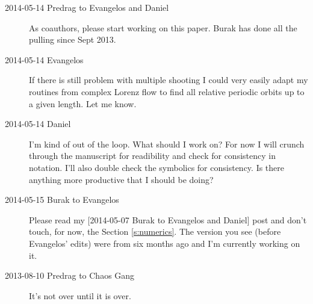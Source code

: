 \begin{description}
\item[2014-05-14 Predrag to Evangelos and Daniel] As coauthors, please start
working on this paper. Burak has done all the pulling since Sept 2013.

\item[2014-05-14 Evangelos] If there is still problem with multiple shooting
I could very easily adapt my routines from complex Lorenz flow to find
all relative periodic orbits up to a given length. Let me know.

\item[2014-05-14 Daniel] I'm kind of out of the loop. What should I work on? 
For now I will crunch through the manuscript for readibility and check for
consistency in notation. I'll also double check the symbolics for consistency.
Is there anything more productive that I should be doing?

\item[2014-05-15 Burak to Evangelos] Please read my 
[2014-05-07 Burak to Evangelos and Daniel] post and don't touch, for now, 
the Section \ref{s:numerics}. The version you see (before Evangelos' edits) 
were from six months ago and I'm currently working on it.

\item[2013-08-10  Predrag to Chaos Gang] It's not over until it is over.

\end{description}
